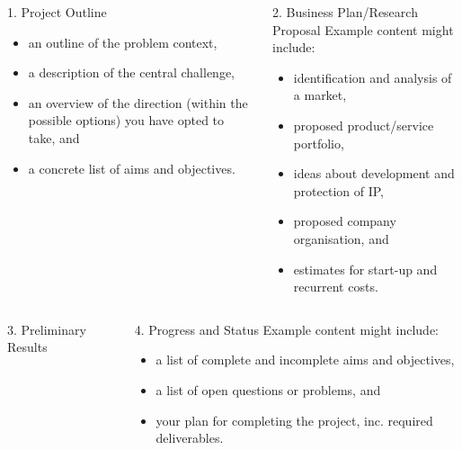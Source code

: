 \documentclass[ %
                    author={Daniel Page},
                supervisor={Dr. Andrew Calway},
                    degree={MEng},
                     title={Some Structural Guidelines for CS MEng Posters},
                  subtitle={},
                      type={enterprise},
                      year={2014} ]{poster}
\begin{document}
\begin{frame}{}
\begin{columns}[t]
\begin{column}{0.422\linewidth}
\begin{block}{\Large 1. Project Outline}
  \begin{itemize}
  \item an outline of the problem context,
  \item a description of the central challenge, 
  \item an overview of the direction (within the possible options) you 
        have opted to take,
        and
  \item a concrete list of aims and objectives.
  \end{itemize}
  \end{block}
  \end{column}

  \begin{column}{0.422\linewidth}
  \begin{block}{\Large 2. Business Plan/Research Proposal}
  Example content might include:

  \begin{itemize}
  \item identification and analysis of a market,
  \item proposed product/service portfolio,
  \item ideas about development and protection of IP,
  \item proposed company organisation,
        and
  \item estimates for start-up and recurrent costs.
  \end{itemize}
  \end{block}
  \end{column}
\end{columns}

\vfill

\begin{columns}[t]
  \begin{column}{0.422\linewidth}
  \begin{block}{\Large 3. Preliminary Results}
  \vspace{10cm}
  \end{block}
  \end{column}
  \begin{column}{0.422\linewidth}
  \begin{block}{\Large 4. Progress and Status}
  Example content might include:

  \begin{itemize}
  \item a list of complete and incomplete aims and objectives,
  \item a list of open questions or problems,
        and
  \item your plan for completing the project, inc. required deliverables.
  \end{itemize}
  \end{block}
  \end{column}
\end{columns}

\vfill

\end{frame}

\end{document}
